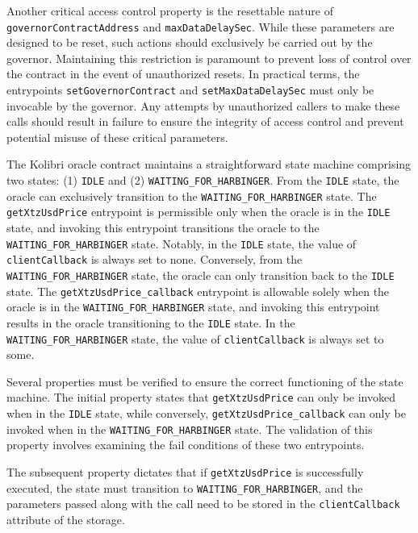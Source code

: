 \documentclass[a4paper,USenglish,cleveref, autoref,anonymous]{lipics-v2021}
\begin{document}
Another critical access control property is the resettable nature of \lstinline/governorContractAddress/ and \lstinline/maxDataDelaySec/. While these parameters are designed to be reset, such actions should exclusively be carried out by the governor. Maintaining this restriction is paramount to prevent loss of control over the contract in the event of unauthorized resets. In practical terms, the entrypoints \lstinline/setGovernorContract/ and \lstinline/setMaxDataDelaySec/ must only be invocable by the governor. Any attempts by unauthorized callers to make these calls should result in failure to ensure the integrity of access control and prevent potential misuse of these critical parameters.

The Kolibri oracle contract maintains a straightforward state machine comprising two states: (1) \lstinline/IDLE/ and (2) \lstinline/WAITING_FOR_HARBINGER/. From the \lstinline/IDLE/ state, the oracle can exclusively transition to the \lstinline/WAITING_FOR_HARBINGER/ state. The \lstinline/getXtzUsdPrice/ entrypoint is permissible only when the oracle is in the \lstinline/IDLE/ state, and invoking this entrypoint transitions the oracle to the \lstinline/WAITING_FOR_HARBINGER/ state. Notably, in the \lstinline/IDLE/ state, the value of \lstinline/clientCallback/ is always set to none. Conversely, from the \lstinline/WAITING_FOR_HARBINGER/ state, the oracle can only transition back to the \lstinline/IDLE/ state. The \lstinline/getXtzUsdPrice_callback/ entrypoint is allowable solely when the oracle is in the \lstinline/WAITING_FOR_HARBINGER/ state, and invoking this entrypoint results in the oracle transitioning to the \lstinline/IDLE/ state. In the \lstinline/WAITING_FOR_HARBINGER/ state, the value of \lstinline/clientCallback/ is always set to some.

Several properties must be verified to ensure the correct functioning of the state machine. The initial property states that \lstinline/getXtzUsdPrice/ can only be invoked when in the \lstinline/IDLE/ state, while conversely, \lstinline/getXtzUsdPrice_callback/ can only be invoked when in the \lstinline/WAITING_FOR_HARBINGER/ state. The validation of this property involves examining the fail conditions of these two entrypoints.

The subsequent property dictates that if \lstinline/getXtzUsdPrice/ is successfully executed, the state must transition to \lstinline/WAITING_FOR_HARBINGER/, and the parameters passed along with the call need to be stored in the \lstinline/clientCallback/ attribute of the storage.
\end{document}

